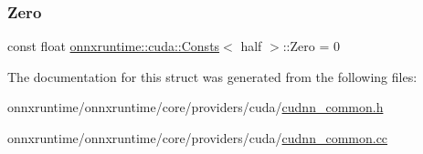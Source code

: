 \subsubsection{\texorpdfstring{Zero}{Zero}}
{\footnotesize\ttfamily const float \mbox{\hyperlink{structonnxruntime_1_1cuda_1_1Consts}{onnxruntime\+::cuda\+::\+Consts}}$<$ half $>$\+::Zero = 0\hspace{0.3cm}{\ttfamily [static]}}



The documentation for this struct was generated from the following files\+:\begin{DoxyCompactItemize}
\item 
onnxruntime/onnxruntime/core/providers/cuda/\mbox{\hyperlink{cudnn__common_8h}{cudnn\+\_\+common.\+h}}\item 
onnxruntime/onnxruntime/core/providers/cuda/\mbox{\hyperlink{cudnn__common_8cc}{cudnn\+\_\+common.\+cc}}\end{DoxyCompactItemize}
